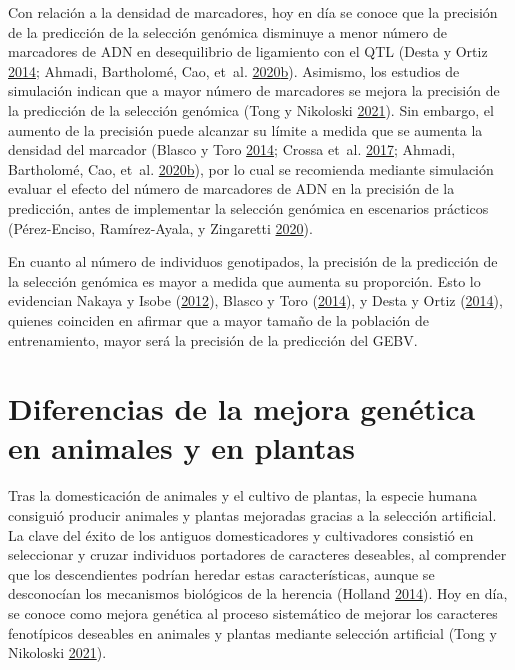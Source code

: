 \documentclass[11pt,spanish,a4paper,oneside,]{book} %
\begin{document}
Con relación a la densidad de marcadores, hoy en día se conoce que la precisión de la predicción de la selección genómica disminuye a menor número de marcadores de ADN en desequilibrio de ligamiento con el QTL (Desta y Ortiz \protect\hyperlink{ref-cite:10}{2014}; Ahmadi, Bartholomé, Cao, et~al. \protect\hyperlink{ref-cite:45}{2020}\protect\hyperlink{ref-cite:45}{b}). Asimismo, los estudios de simulación indican que a mayor número de marcadores se mejora la precisión de la predicción de la selección genómica (Tong y Nikoloski \protect\hyperlink{ref-cite:7}{2021}). Sin embargo, el aumento de la precisión puede alcanzar su límite a medida que se aumenta la densidad del marcador (Blasco y Toro \protect\hyperlink{ref-cite:3}{2014}; Crossa et~al. \protect\hyperlink{ref-cite:37}{2017}; Ahmadi, Bartholomé, Cao, et~al. \protect\hyperlink{ref-cite:45}{2020}\protect\hyperlink{ref-cite:45}{b}), por lo cual se recomienda mediante simulación evaluar el efecto del número de marcadores de ADN en la precisión de la predicción, antes de implementar la selección genómica en escenarios prácticos (Pérez-Enciso, Ramírez-Ayala, y Zingaretti \protect\hyperlink{ref-cite:47}{2020}).

En cuanto al número de individuos genotipados, la precisión de la predicción de la selección genómica es mayor a medida que aumenta su proporción. Esto lo evidencian Nakaya y Isobe (\protect\hyperlink{ref-cite:6}{2012}), Blasco y Toro (\protect\hyperlink{ref-cite:3}{2014}), y Desta y Ortiz (\protect\hyperlink{ref-cite:10}{2014}), quienes coinciden en afirmar que a mayor tamaño de la población de entrenamiento, mayor será la precisión de la predicción del GEBV.

\hypertarget{diferencias-de-la-mejora-genuxe9tica-en-animales-y-en-plantas}{%
\section{Diferencias de la mejora genética en animales y en plantas}\label{diferencias-de-la-mejora-genuxe9tica-en-animales-y-en-plantas}}

Tras la domesticación de animales y el cultivo de plantas, la especie humana consiguió producir animales y plantas mejoradas gracias a la selección artificial. La clave del éxito de los antiguos domesticadores y cultivadores consistió en seleccionar y cruzar individuos portadores de caracteres deseables, al comprender que los descendientes podrían heredar estas características, aunque se desconocían los mecanismos biológicos de la herencia (Holland \protect\hyperlink{ref-cite:43}{2014}). Hoy en día, se conoce como mejora genética al proceso sistemático de mejorar los caracteres fenotípicos deseables en animales y plantas mediante selección artificial (Tong y Nikoloski \protect\hyperlink{ref-cite:7}{2021}).
\end{document}
